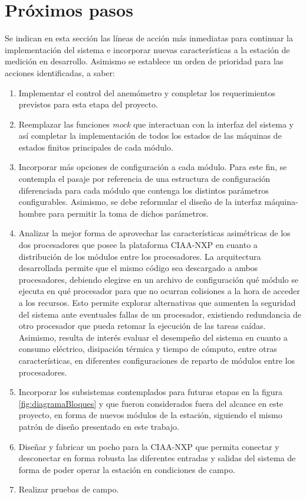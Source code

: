 \section{Próximos pasos}

Se indican en esta sección las líneas de acción más inmediatas para continuar la implementación del sistema e incorporar nuevas características a la estación de medición en desarrollo.  Asimismo se establece un orden de prioridad para las acciones identificadas, a saber:

\begin{enumerate}
  \item Implementar el control del anemómetro y completar los requerimientos previstos para esta etapa del proyecto.
  \item Reemplazar las funciones \textit{mock} que interactuan con la interfaz del sistema y así completar la implementación de todos los estados de las máquinas de estados finitos principales de cada módulo.
  \item Incorporar más opciones de configuración a cada módulo.  Para este fin, se contempla el pasaje por referencia de una estructura de configuración diferenciada para cada módulo que contenga los distintos parámetros configurables.  Asimismo, se debe reformular el diseño de la interfaz máquina-hombre para permitir la toma de dichos parámetros.
  \item Analizar la mejor forma de aprovechar las características asimétricas de los dos procesadores que posee la plataforma CIAA-NXP en cuanto a distribución de los módulos entre los procesadores.  La arquitectura desarrollada permite que el mismo código sea descargado a ambos procesadores, debiendo elegirse en un archivo de configuración qué módulo se ejecuta en qué procesador para que no ocurran colisiones a la hora de acceder a los recursos.  Esto permite explorar alternativas que aumenten la seguridad del sistema ante eventuales fallas de un procesador, existiendo redundancia de otro procesador que pueda retomar la ejecución de las tareas caídas.  Asimismo, resulta de interés evaluar el desempeño del sistema en cuanto a consumo eléctrico, disipación térmica y tiempo de cómputo, entre otras características, en diferentes configuraciones de reparto de módulos entre los procesadores.
  \item Incorporar los subsistemas contemplados para futuras etapas en la figura \ref{fig:diagramaBloques} y que fueron considerados fuera del alcance en este proyecto, en forma de nuevos módulos de la estación, siguiendo el mismo patrón de diseño presentado en este trabajo.
  \item Diseñar y fabricar un pocho para la CIAA-NXP que permita conectar y desconectar en forma robusta las diferentes entradas y salidas del sistema de forma de poder operar la estación en condiciones de campo.
  \item Realizar pruebas de campo. 
\end{enumerate}


